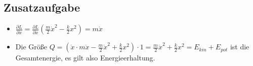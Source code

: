 \documentclass[12pt]{article}
\begin{document}
\subsection*{Zusatzaufgabe}

\begin{itemize}
\item $\frac{\partial L}{\partial \dot x} = \frac{\partial L}{\partial \dot x} \left(\frac{m}{2}\dot{x}^2 - \frac{k}{2}x^2\right) = m\dot x$
\item Die Größe $Q=(\dot x \cdot m\dot x - \frac{m}{2}\dot x^2 + \frac{k}{2}x^2)\cdot 1 = \frac{m}{2}\dot x^2 + \frac{k}{2}x^2 = E_{kin}+E_{pot}$ ist die Gesamtenergie, es gilt also Energieerhaltung.
\end{itemize}
\end{document}
